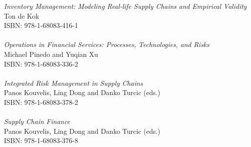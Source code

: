 \vspace{12pt}
\noindent \textit{Inventory Management:  Modeling Real-life Supply Chains and Empirical Validity}\\
Ton de Kok
\\ISBN: 978-1-68083-416-1
\\
\\
\noindent \textit{Operations in Financial Services: Processes, Technologies, and Risks}\\
Michael Pinedo and Yuqian Xu
\\ISBN: 978-1-68083-336-2
\\
\\
\noindent \textit{Integrated Risk Management in Supply Chains}\\
Panos Kouvelis, Ling Dong and Danko Turcic (eds.)
\\ISBN: 978-1-68083-378-2
\\
\\
\noindent \textit{Supply Chain Finance}\\
Panos Kouvelis, Ling Dong and Danko Turcic (eds.)
\\ISBN: 978-1-68083-376-8